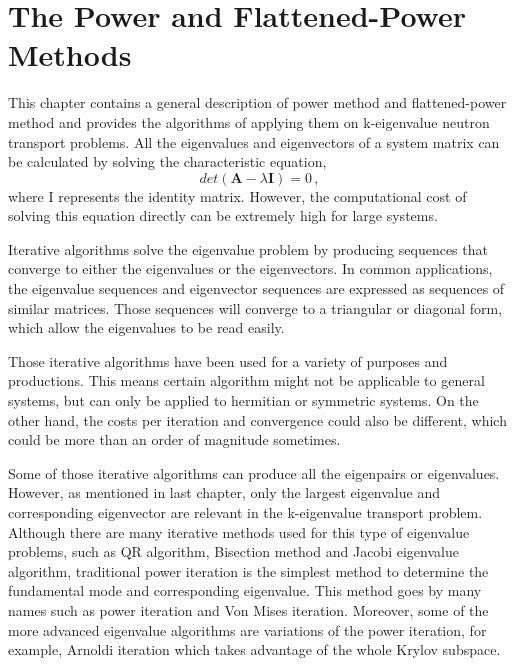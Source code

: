 \cleardoublepage

\chapter{The Power and Flattened-Power Methods}
\label{chapter:PM}

This chapter contains a general description of power method and flattened-power method and provides the algorithms of applying them on k-eigenvalue neutron transport problems.
All the eigenvalues and eigenvectors of a system matrix can be calculated by solving the characteristic equation,
\begin{equation}
det(\mathbf{A} -\lambda \mathbf{I} ) = 0 \, ,
\label{eq:characteristic}
\end{equation}
where I represents the identity matrix.
However, the computational cost of solving this equation directly can be extremely high for large systems. 

Iterative algorithms solve the eigenvalue problem by producing sequences that converge to either the eigenvalues or the eigenvectors.
In common applications, the eigenvalue sequences and eigenvector sequences are expressed as sequences of similar matrices. 
Those sequences will converge to a triangular or diagonal form, which allow the eigenvalues to be read easily. 

Those iterative algorithms have been used for a variety of purposes and productions.
This means certain algorithm might not be applicable to general systems, but can only be applied to hermitian or symmetric systems.
On the other hand, the costs per iteration and convergence could also be different, which could be more than an order of magnitude sometimes. 

Some of those iterative algorithms can produce all the eigenpairs or eigenvalues. 
However, as mentioned in last chapter, only the largest eigenvalue and corresponding eigenvector are relevant in the k-eigenvalue transport problem.
Although there are many iterative methods used for this type of eigenvalue problems, such as QR algorithm, Bisection method and Jacobi eigenvalue algorithm, traditional power iteration is the simplest method to determine the fundamental mode and corresponding eigenvalue.
This method goes by many names such as power iteration and Von Mises iteration\cite{mises1929praktische}.
Moreover, some of the more advanced eigenvalue algorithms are variations of the power iteration, for example, Arnoldi iteration \cite{arnoldi1951principle} which takes advantage of the whole Krylov subspace. 


